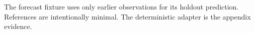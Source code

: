\documentclass[a4paper]{article}
\begin{document}
\label{mm:body-start}The forecast fixture uses only earlier observations for its holdout prediction.\label{mm:body-end}
\clearpage\label{mm:references-start}References are intentionally minimal.\label{mm:references-end}
\clearpage\label{mm:appendix-start}The deterministic adapter is the appendix evidence.\label{mm:appendix-end}
\end{document}
